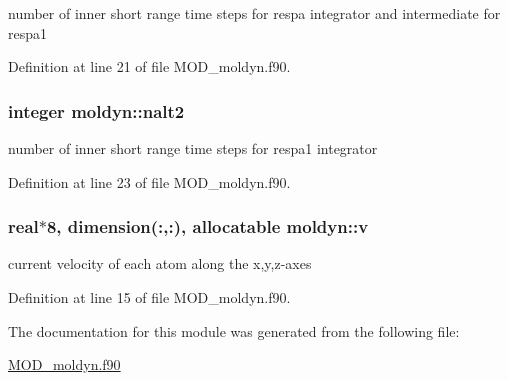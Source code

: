 number of inner short range time steps for respa integrator and intermediate for respa1 



Definition at line 21 of file M\-O\-D\-\_\-moldyn.\-f90.

\hypertarget{classmoldyn_ad6964022cb98874d3ce9b7db35f12ad4}{
\subsubsection[{nalt2}]{\setlength{\rightskip}{0pt plus 5cm}integer moldyn\-::nalt2}}\label{classmoldyn_ad6964022cb98874d3ce9b7db35f12ad4}


number of inner short range time steps for respa1 integrator 



Definition at line 23 of file M\-O\-D\-\_\-moldyn.\-f90.

\hypertarget{classmoldyn_a9b6e981d143cad48fcc41f194e8b826d}{
\subsubsection[{v}]{\setlength{\rightskip}{0pt plus 5cm}real$\ast$8, dimension(\-:,\-:), allocatable moldyn\-::v}}\label{classmoldyn_a9b6e981d143cad48fcc41f194e8b826d}


current velocity of each atom along the x,y,z-\/axes 



Definition at line 15 of file M\-O\-D\-\_\-moldyn.\-f90.



The documentation for this module was generated from the following file\-:\begin{DoxyCompactItemize}
\item 
\hyperlink{MOD__moldyn_8f90}{M\-O\-D\-\_\-moldyn.\-f90}\end{DoxyCompactItemize}
